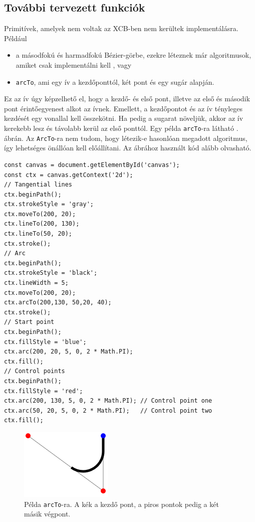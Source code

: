 \subsection{További tervezett funkciók}

Primitívek, amelyek nem voltak az XCB-ben nem kerültek implementálásra. Például
\begin{itemize}
    \item a másodfokú és harmadfokú Bézier-görbe, ezekre léteznek már algoritmusok, amiket csak implementálni kell \cite{de-casteljau}, vagy
    \item \texttt{arcTo}, ami egy ív a kezdőponttól, két pont és egy sugár alapján.
\end{itemize}
Ez az ív úgy képzelhető el, hogy a kezdő- és első pont, illetve az első és második pont érintőegyenest alkot az ívnek. Emellett, a kezdőpontot és az ív tényleges kezdését egy vonallal kell összekötni. Ha pedig a sugarat növeljük, akkor az ív kerekebb lesz és távolabb kerül az első ponttól. Egy példa \texttt{arcTo}-ra látható . ábrán. Az \texttt{ArcTo}-ra nem tudom, hogy létezik-e hasonlóan megadott algoritmus, így lehetséges önállóan kell előállítani. Az ábrához használt kód alább olvasható.

\begin{verbatim}
const canvas = document.getElementById('canvas');
const ctx = canvas.getContext('2d');
// Tangential lines
ctx.beginPath();
ctx.strokeStyle = 'gray';
ctx.moveTo(200, 20);
ctx.lineTo(200, 130);
ctx.lineTo(50, 20);
ctx.stroke();
// Arc
ctx.beginPath();
ctx.strokeStyle = 'black';
ctx.lineWidth = 5;
ctx.moveTo(200, 20);
ctx.arcTo(200,130, 50,20, 40);
ctx.stroke();
// Start point
ctx.beginPath();
ctx.fillStyle = 'blue';
ctx.arc(200, 20, 5, 0, 2 * Math.PI);
ctx.fill();
// Control points
ctx.beginPath();
ctx.fillStyle = 'red';
ctx.arc(200, 130, 5, 0, 2 * Math.PI); // Control point one
ctx.arc(50, 20, 5, 0, 2 * Math.PI);   // Control point two
ctx.fill();
\end{verbatim}

\begin{figure}
    \centering
    \includegraphics{images/arcTo.png}
    \caption{Példa \texttt{arcTo}-ra. A kék a kezdő pont, a piros pontok pedig a két másik végpont.}
    \label{fig:arcTo}
\end{figure}


